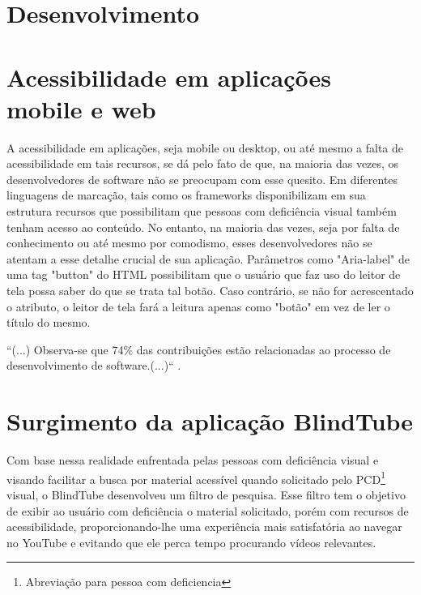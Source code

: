 \documentclass[12pt]{article}
\begin{document}
\section{Desenvolvimento}

\section{Acessibilidade em aplicações mobile e web}

A acessibilidade em aplicações, seja mobile ou desktop, ou até mesmo a falta de acessibilidade em tais recursos, se dá pelo fato de que, na maioria das vezes, os desenvolvedores de software não se preocupam com esse quesito. Em diferentes linguagens de marcação, tais como os frameworks disponibilizam em sua estrutura recursos que possibilitam que pessoas com deficiência visual também tenham acesso ao conteúdo. No entanto, na maioria das vezes, seja por falta de conhecimento ou até mesmo por comodismo, esses desenvolvedores não se atentam a esse detalhe crucial de sua aplicação. Parâmetros como "Aria-label" de uma tag "button" do HTML possibilitam que o usuário que faz uso do leitor de tela possa saber do que se trata tal botão. Caso contrário, se não for acrescentado o atributo, o leitor de tela fará a leitura apenas como "botão" em vez de ler o título do mesmo. 

``(...) Observa-se que 74\% das contribuições estão relacionadas ao processo de desenvolvimento de software.(...)`` \cite{semish2016}.


\section{Surgimento da aplicação BlindTube}

Com base nessa realidade enfrentada pelas pessoas com deficiência visual e visando facilitar a busca por material acessível quando solicitado pelo PCD\thanks{Abreviação para pessoa com deficiencia} visual, o BlindTube desenvolveu um filtro de pesquisa. Esse filtro tem o objetivo de exibir ao usuário com deficiência o material solicitado, porém com recursos de acessibilidade, proporcionando-lhe uma experiência mais satisfatória ao navegar no YouTube e evitando que ele perca tempo procurando vídeos relevantes.
\end{document}
